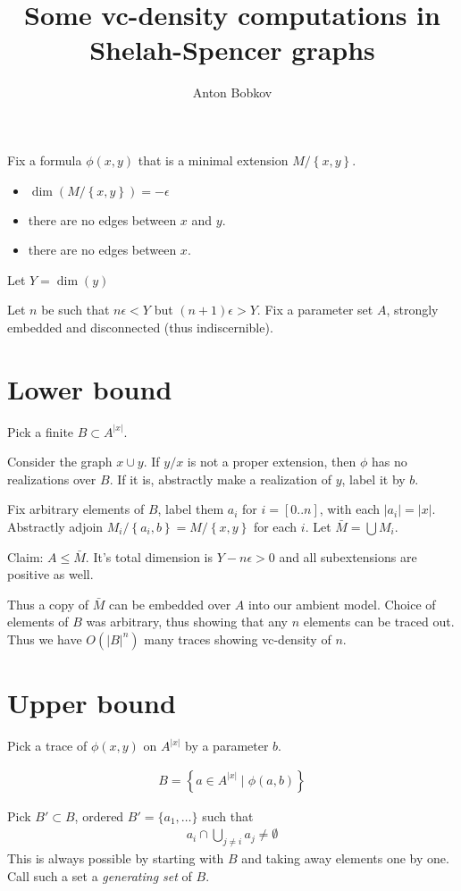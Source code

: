 \documentclass{amsart}
\newcommand{\curly}[1]{\left\{#1\right\}}
\newcommand{\paren}[1]{\left(#1\right)}
\begin{document}
\title{Some vc-density computations in Shelah-Spencer graphs}
\author{Anton Bobkov}

Fix a formula $\phi(x, y)$ that is a minimal extension $M/\curly{x,y}$. 
\begin{itemize}
	\item $\dim \paren{M/\curly{x,y}} = -\epsilon$
	\item there are no edges between $x$ and $y$.
	\item there are no edges between $x$.
\end{itemize}

Let $Y = \dim (y)$

Let $n$ be such that $n\epsilon < Y$ but $(n+1)\epsilon > Y$.
Fix a parameter set $A$, strongly embedded and disconnected (thus indiscernible).

\section{Lower bound}

Pick a finite $B \subset A^{|x|}$.

Consider the graph $x \cup y$.
If $y/x$ is not a proper extension, then $\phi$ has no realizations over $B$.
If it is, abstractly make a realization of $y$, label it by $b$.

Fix arbitrary elements of $B$, label them $a_i$ for $i=[0..n]$, with each $|a_i| = |x|$.
Abstractly adjoin $M_i/\curly{a_i, b} = M/\curly{x,y}$ for each $i$.
Let $\bar M = \bigcup M_i$.

Claim: $A \leq \bar M$.
It's total dimension is $Y - n\epsilon > 0$ and all subextensions are positive as well.

Thus a copy of $\bar M$ can be embedded over $A$ into our ambient model.
Choice of elements of $B$ was arbitrary, thus showing that any $n$ elements can be traced out.
Thus we have $O(|B|^n)$ many traces showing vc-density of $n$.

\section{Upper bound}

Pick a trace of $\phi(x,y)$ on $A^{|x|}$ by a parameter $b$.

\begin{align*}
	B = \curly{a \in A^{|x|} \mid \phi(a, b)}
\end{align*}

Pick $B' \subset B$, ordered $B' = \{a_1, \ldots\}$ such that
\begin{align*}
	a_i \cap \bigcup_{j \neq i} a_j \neq \emptyset
\end{align*}
This is always possible by starting with $B$ and taking away elements one by one.
Call such a set a \emph{generating set} of $B$.
\end{document}
